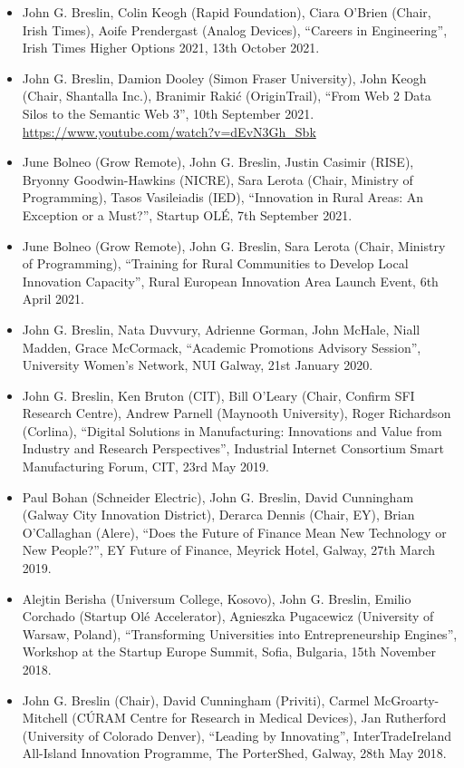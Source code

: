 \documentclass[10pt,a4paper]{res} %
\begin{document}
\begin{resume}
\begin{itemize}
\item John G. Breslin, Colin Keogh (Rapid Foundation), Ciara O'Brien (Chair, Irish Times), Aoife Prendergast (Analog Devices), ``Careers in Engineering'', Irish Times Higher Options 2021, 13th October 2021.
\item John G. Breslin, Damion Dooley (Simon Fraser University), John Keogh (Chair, Shantalla Inc.), Branimir Raki\'{c} (OriginTrail), ``From Web 2 Data Silos to the Semantic Web 3'', 10th September 2021. \url{https://www.youtube.com/watch?v=dEvN3Gh_Sbk}
\item June Bolneo (Grow Remote), John G. Breslin, Justin Casimir (RISE), Bryonny Goodwin-Hawkins (NICRE), Sara Lerota (Chair, Ministry of Programming), Tasos Vasileiadis (IED), ``Innovation in Rural Areas: An Exception or a Must?'', Startup OL\'{E}, 7th September 2021.
\item June Bolneo (Grow Remote), John G. Breslin, Sara Lerota (Chair, Ministry of Programming), ``Training for Rural Communities to Develop Local Innovation Capacity'', Rural European Innovation Area Launch Event, 6th April 2021.
\item John G. Breslin, Nata Duvvury, Adrienne Gorman, John McHale, Niall Madden, Grace McCormack, ``Academic Promotions Advisory Session'', University Women's Network, NUI Galway, 21st January 2020.
\item John G. Breslin, Ken Bruton (CIT), Bill O’Leary (Chair, Confirm SFI Research Centre), Andrew Parnell (Maynooth University), Roger Richardson (Corlina), ``Digital Solutions in Manufacturing: Innovations and Value from Industry and Research Perspectives'', Industrial Internet Consortium Smart Manufacturing Forum, CIT, 23rd May 2019.
\item Paul Bohan (Schneider Electric), John G. Breslin, David Cunningham (Galway City Innovation District), Derarca Dennis (Chair, EY), Brian O’Callaghan (Alere), ``Does the Future of Finance Mean New Technology or New People?'', EY Future of Finance, Meyrick Hotel, Galway, 27th March 2019.
\item Alejtin Berisha (Universum College, Kosovo), John G. Breslin, Emilio Corchado (Startup Ol\'{e} Accelerator), Agnieszka Pugacewicz (University of Warsaw, Poland), ``Transforming Universities into Entrepreneurship Engines'', Workshop at the Startup Europe Summit, Sofia, Bulgaria, 15th November 2018.
\item John G. Breslin (Chair), David Cunningham (Priviti), Carmel McGroarty-Mitchell (C\'{U}RAM Centre for Research in Medical Devices), Jan Rutherford (University of Colorado Denver), ``Leading by Innovating'', InterTradeIreland All-Island Innovation Programme, The PorterShed, Galway, 28th May 2018.

\end{itemize}
\end{resume}
\end{document}
